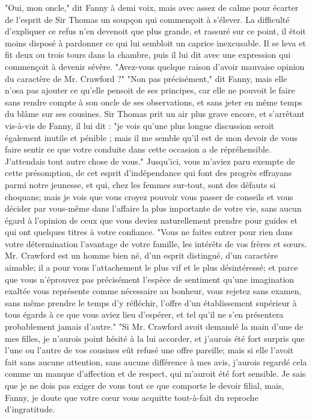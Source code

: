 "Oui, mon oncle," dit Fanny à demi voix, mais avec assez de calme pour écarter de l'esprit de Sir Thomas un soupçon qui commençoit à s'élever.
La difficulté d'expliquer ce refus n'en devenoit que plus grande, et rassuré sur ce point, il étoit moins disposé à pardonner ce qui lui sembloit un caprice inexcusable.
Il se leva et fit deux ou trois tours dans la chambre, puis il lui dit avec une expression qui commençoit à devenir sévère. "Avez-vous quelque raison d'avoir mauvaise opinion du caractère de Mr. Crawford ?"
"Non pas précisément," dit Fanny, mais elle n'osa pas ajouter ce qu'elle pensoit de ses principes, car elle ne pouvoit le faire sans rendre compte à son oncle de ses observations, et sans jeter en même temps du blâme sur ses cousines. Sir Thomas prit un air plus grave encore, et s'arrêtant vis-à-vis de Fanny, il lui dit : "je vois qu'une plus longue discussion seroit également inutile et pénible ; mais il me semble qu'il est de mon devoir de vous faire sentir ce que votre conduite dans cette occasion a de répréhensible. J'attendais tout autre chose de vous."\setcounter{page}{271} Jusqu'ici, vous m'aviez paru exempte de cette présomption, de cet esprit d'indépendance qui font des progrès effrayans parmi notre jeunesse, et qui, chez les femmes sur-tout, sont des défauts si choquans; mais je vois que vous croyez pouvoir vous passer de conseils et vous décider par vous-même dans l'affaire la plus importante de votre vie, sans aucun égard à l'opinion de ceux que vous deviez naturellement prendre pour guides et qui ont quelques titres à votre confiance.
"Vous ne faites entrer pour rien dans votre détermination l'avantage de votre famille, les intérêts de vos frères et sœurs. Mr. Crawford est un homme bien né, d'un esprit distingué, d'un caractère aimable; il a pour vous l'attachement le plus vif et le plus désintéressé; et parce que vous n'éprouvez pas précisément l'espèce de sentiment qu'une imagination exaltée vous représente comme nécessaire au bonheur, vous rejetez sans examen, sans même prendre le temps d'y réfléchir, l'offre d'un établissement supérieur à tous égards à ce que vous aviez lieu d'espérer, et tel qu'il ne s'en présentera probablement jamais d'autre."
"Si Mr. Crawford avoit demandé la main d'une de mes filles, je n'aurois point hésité\setcounter{page}{272} à la lui accorder, et j'aurois été fort surpris que l'une ou l'autre de vos cousines eût refusé une offre pareille; mais si elle l'avoit fait sans aucune attention, sans aucune différence à mes avis, j'aurois regardé cela comme un manque d'affection et de respect, qui m'auroit été fort sensible. Je sais que je ne dois pas exiger de vous tout ce que comporte le devoir filial, mais, Fanny, je doute que votre cœur vous acquitte tout-à-fait du reproche d'ingratitude.
